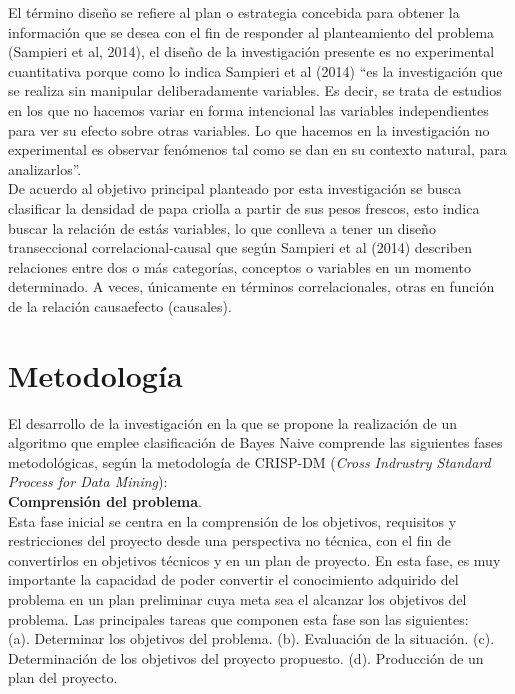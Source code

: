 El término diseño se refiere al plan o estrategia concebida para obtener la información que se desea con el fin de responder al
planteamiento del problema (Sampieri et al, 2014), el diseño de la investigación presente es no experimental cuantitativa porque como lo indica Sampieri et al (2014) “es la investigación que se realiza sin manipular deliberadamente variables. Es decir, se trata de estudios en los que no hacemos variar en forma intencional las variables independientes para ver su efecto sobre otras variables. Lo que hacemos en la investigación no experimental es observar fenómenos tal como se dan en su contexto natural, para analizarlos”.\\

De acuerdo al objetivo principal planteado por esta investigación se busca clasificar la densidad de papa criolla a partir de sus pesos frescos, esto indica buscar la relación de estás variables, lo que conlleva a tener un diseño transeccional correlacional-causal que según Sampieri et al (2014) describen relaciones entre dos o más categorías, conceptos o variables en un momento determinado. A veces, únicamente en términos correlacionales, otras en función de la relación causaefecto (causales).
  

\section{Metodolog\'ia}

El desarrollo de la investigación en la que se propone la realización de un algoritmo que emplee clasificación de Bayes Naive comprende las siguientes fases metodológicas, según la metodología de CRISP-DM (\emph{Cross Indrustry Standard Process for Data Mining}):\\

\noindent
\textbf{Comprensión del problema}.\\

	Esta fase inicial se centra en la comprensión de los objetivos, requisitos y restricciones del proyecto desde una perspectiva no técnica, con el fin de convertirlos en objetivos técnicos y en un plan de proyecto. En esta fase, es muy importante la capacidad de poder convertir el conocimiento adquirido del problema en un plan preliminar cuya meta sea el alcanzar los objetivos del problema. Las principales tareas que componen esta fase son las siguientes:\\

(a).	Determinar los objetivos del problema.
(b).	Evaluación de la situación.
(c).	Determinación de los objetivos del proyecto propuesto.
(d).	Producción de un plan del proyecto.\\


